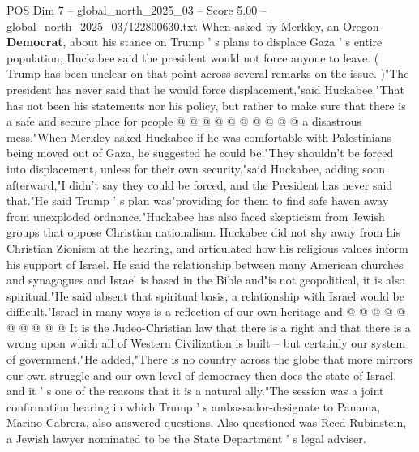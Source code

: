 \begin{textsample}{POS Dim 7 – global\_north\_2025\_03 – Score 5.00 – global\_north\_2025\_03/122800630.txt}
When asked by Merkley, an Oregon \textbf{Democrat}, about his stance on Trump ' s plans to displace Gaza ' s entire population, Huckabee said the president would not force anyone to leave. ( Trump has been unclear on that point across several remarks on the issue. )"The president has never said that he would force displacement,"said Huckabee."That has not been his statements nor his policy, but rather to make sure that there is a safe and secure place for people @ @ @ @ @ @ @ @ @ @ a disastrous mess."When Merkley asked Huckabee if he was comfortable with Palestinians being moved out of Gaza, he suggested he could be."They shouldn't be forced into displacement, unless for their own security,"said Huckabee, adding soon afterward,"I didn't say they could be forced, and the President has never said that."He said Trump ' s plan was"providing for them to find safe haven away from unexploded ordnance."Huckabee has also faced skepticism from Jewish groups that oppose Christian nationalism.
Huckabee did not shy away from his Christian Zionism at the hearing, and articulated how his religious values inform his support of Israel.
He said the relationship between many American churches and synagogues and Israel is based in the Bible and"is not geopolitical, it is also spiritual."He said absent that spiritual basis, a relationship with Israel would be difficult."Israel in many ways is a reflection of our own heritage and @ @ @ @ @ @ @ @ @ @ It is the Judeo-Christian law that there is a right and that there is a wrong upon which all of Western Civilization is built -- but certainly our system of government."He added,"There is no country across the globe that more mirrors our own struggle and our own level of democracy then does the state of Israel, and it ' s one of the reasons that it is a natural ally."The session was a joint confirmation hearing in which Trump ' s ambassador-designate to Panama, Marino Cabrera, also answered questions.
Also questioned was Reed Rubinstein, a Jewish lawyer nominated to be the State Department ' s legal adviser.

\end{textsample}
